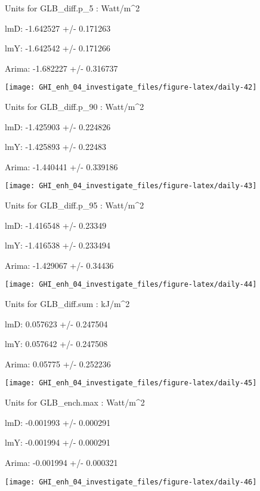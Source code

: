 \documentclass[
  10pt,
  a4paper,oneside]{article}
\begin{document}
Units for GLB\_diff.p\_5 : Watt/m\^{}2

lmD: -1.642527 +/- 0.171263

lmY: -1.642542 +/- 0.171266

Arima: -1.682227 +/- 0.316737

\begin{center}\texttt{[image: GHI\_enh\_04\_investigate\_files/figure-latex/daily-42]} \end{center}

Units for GLB\_diff.p\_90 : Watt/m\^{}2

lmD: -1.425903 +/- 0.224826

lmY: -1.425893 +/- 0.22483

Arima: -1.440441 +/- 0.339186

\begin{center}\texttt{[image: GHI\_enh\_04\_investigate\_files/figure-latex/daily-43]} \end{center}

Units for GLB\_diff.p\_95 : Watt/m\^{}2

lmD: -1.416548 +/- 0.23349

lmY: -1.416538 +/- 0.233494

Arima: -1.429067 +/- 0.34436

\begin{center}\texttt{[image: GHI\_enh\_04\_investigate\_files/figure-latex/daily-44]} \end{center}

Units for GLB\_diff.sum : kJ/m\^{}2

lmD: 0.057623 +/- 0.247504

lmY: 0.057642 +/- 0.247508

Arima: 0.05775 +/- 0.252236

\begin{center}\texttt{[image: GHI\_enh\_04\_investigate\_files/figure-latex/daily-45]} \end{center}

Units for GLB\_ench.max : Watt/m\^{}2

lmD: -0.001993 +/- 0.000291

lmY: -0.001994 +/- 0.000291

Arima: -0.001994 +/- 0.000321

\begin{center}\texttt{[image: GHI\_enh\_04\_investigate\_files/figure-latex/daily-46]} \end{center}
\end{document}
